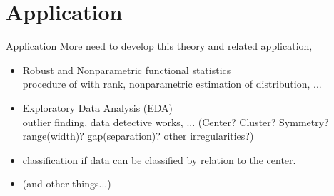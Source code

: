 \documentclass[aspectratio=169,ignorenonframetext,9pt]{beamer}
\theoremstyle{plain}
\theoremstyle{definition}
\begin{document}
\section{Application}
\begin{frame}{Application}
More need to develop this theory and related application,
\begin{itemize}
    \item Robust and Nonparametric functional statistics \\
    procedure of with rank, nonparametric estimation of distribution, ...
    \item Exploratory Data Analysis (EDA) \\
    outlier finding, data detective works, ...
    (Center? Cluster? Symmetry? range(width)? gap(separation)? other irregularities?)
    \item classification
    if data can be classified by relation to the center.
    \item (and other things...)
\end{itemize}
\end{frame}
\end{document}
